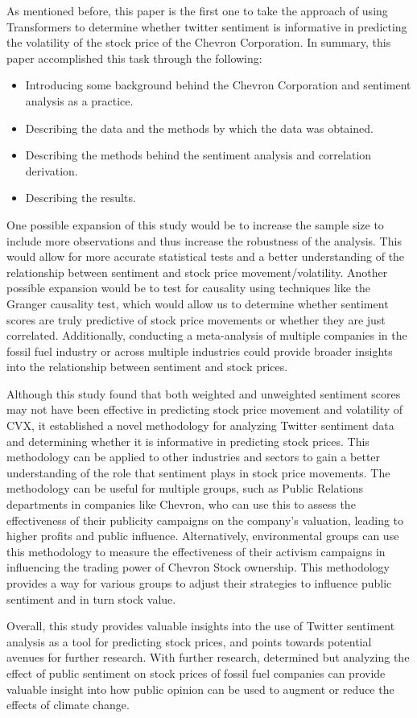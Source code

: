 \documentclass[12pt, letterpaper, titlepage]{article}
\newcommand{\jy}[1]{\textcolor{blue}{JY: #1}}
\begin{document}
As mentioned before, this paper is the first one to take the approach of using Transformers to determine whether twitter sentiment is informative in predicting the volatility of the stock price of the Chevron Corporation. In summary, this paper accomplished this task through the following:
\begin{itemize}
    \item Introducing some background behind the Chevron Corporation and sentiment analysis as a practice.
    \item Describing the data and the methods by which the data was obtained.
    \item Describing the methods behind the sentiment analysis and correlation derivation.
    \item Describing the results.
\end{itemize}


One possible expansion of this study would be to increase the sample size to include more observations and thus increase the robustness of the analysis. This would allow for more accurate statistical tests and a better understanding of the relationship between sentiment and stock price movement/volatility. Another possible expansion would be to test for causality using techniques like the Granger causality test, which would allow us to determine whether sentiment scores are truly predictive of stock price movements or whether they are just correlated. Additionally, conducting a meta-analysis of multiple companies in the fossil fuel industry or across multiple industries could provide broader insights into the relationship between sentiment and stock prices. 

Although this study found that both weighted and unweighted sentiment scores may not have been effective in predicting stock price movement and volatility of CVX, it established a novel methodology for analyzing Twitter sentiment data and determining whether it is informative in predicting stock prices. This methodology can be applied to other industries and sectors to gain a better understanding of the role that sentiment plays in stock price movements. The methodology can be useful for multiple groups, such as Public Relations departments in companies like Chevron, who can use this to assess the effectiveness of their publicity campaigns on the company's valuation, leading to higher profits and public influence. Alternatively, environmental groups can use this methodology to measure the effectiveness of their activism campaigns in influencing the trading power of Chevron Stock ownership. This methodology provides a way for various groups to adjust their strategies to influence public sentiment and in turn stock value.

Overall, this study provides valuable insights into the use of Twitter sentiment analysis as a tool for predicting stock prices, and points towards potential avenues for further research. With further research, determined but analyzing the effect of public sentiment on stock prices of fossil fuel companies can provide valuable insight into how public opinion can be used to augment or reduce the effects of climate change.




\end{document}
